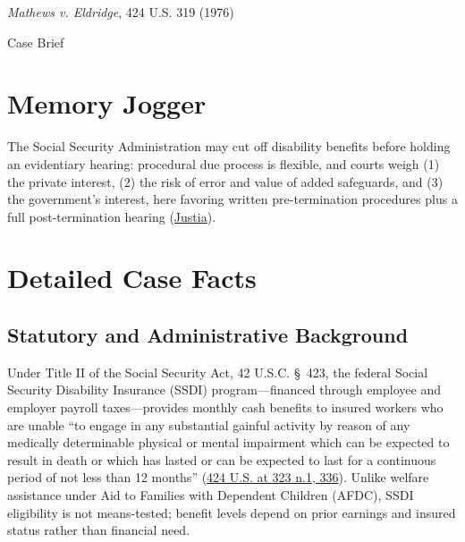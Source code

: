 \documentclass[12pt]{article}
\begin{document}
\begin{center}
{\LARGE \textit{Mathews v. Eldridge}, 424 U.S. 319 (1976)\par}
\vspace{0.8em}
{\large Case Brief\par}
\end{center}
\vspace{1em}

\section{Memory Jogger}
The Social Security Administration may cut off disability benefits before holding an evidentiary hearing: procedural due process is flexible, and courts weigh (1) the private interest, (2) the risk of error and value of added safeguards, and (3) the government's interest, here favoring written pre-termination procedures plus a full post-termination hearing (\href{https://supreme.justia.com/cases/federal/us/424/319/}{Justia}).

\section{Detailed Case Facts}
\subsection{Statutory and Administrative Background}
Under Title II of the Social Security Act, 42 U.S.C. \S~423, the federal Social Security Disability Insurance (SSDI) program---financed through employee and employer payroll taxes---provides monthly cash benefits to insured workers who are unable ``to engage in any substantial gainful activity by reason of any medically determinable physical or mental impairment which can be expected to result in death or which has lasted or can be expected to last for a continuous period of not less than 12 months'' (\href{https://supreme.justia.com/cases/federal/us/424/319/}{424 U.S. at 323 n.1, 336}). Unlike welfare assistance under Aid to Families with Dependent Children (AFDC), SSDI eligibility is not means-tested; benefit levels depend on prior earnings and insured status rather than financial need.
\end{document}
